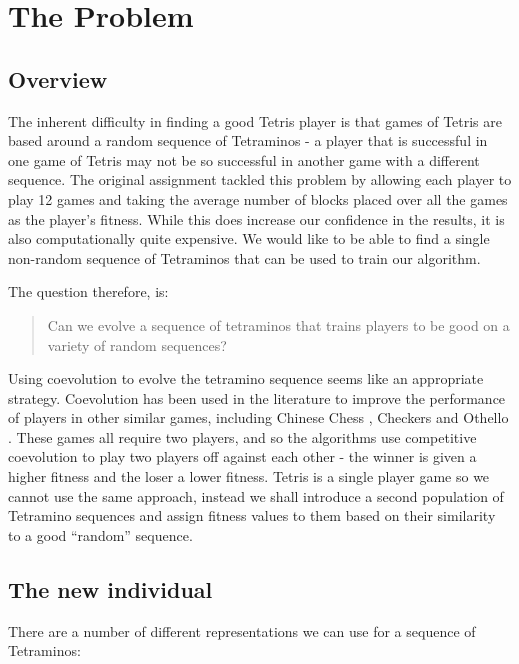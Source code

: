 \documentclass[a4paper,11pt]{article}
\begin{document}
\section{The Problem}

\subsection{Overview}

The inherent difficulty in finding a good Tetris player is that games of
Tetris are based around a random sequence of Tetraminos - a player that is
successful in one game of Tetris may not be so successful in another game with
a different sequence.
The original assignment tackled this problem by allowing each player to play
12 games and taking the average number of blocks placed over all the games as
the player's fitness.
While this does increase our confidence in the results, it is also
computationally quite expensive.
We would like to be able to find a single non-random sequence of Tetraminos
that can be used to train our algorithm.

The question therefore, is:

\begin{quote}
  Can we evolve a sequence of tetraminos that trains players to be good on a
  variety of random sequences?
\end{quote}

Using coevolution to evolve the tetramino sequence seems like an appropriate
strategy.
Coevolution has been used in the literature to improve the performance of
players in other similar games, including Chinese Chess
\cite{ong2007discovering}, Checkers \cite{chellapilla1999evolving} and
Othello \cite{moriarty1995discovering}.
These games all require two players, and so the algorithms use competitive
coevolution to play two players off against each other - the winner is given a
higher fitness and the loser a lower fitness.
Tetris is a single player game so we cannot use the same approach, instead we
shall introduce a second population of Tetramino sequences and assign fitness
values to them based on their similarity to a good ``random'' sequence.

\subsection{The new individual}

There are a number of different representations we can use for a sequence of
Tetraminos:
\end{document}
